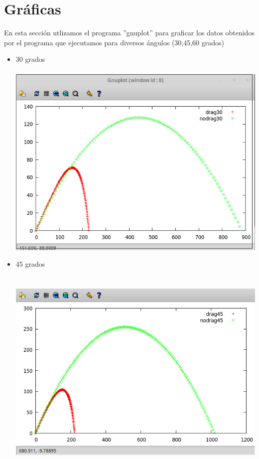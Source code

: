 \documentclass[10pt,a4paper]{article}
\begin{document}
\section*{Gr\'aficas}

En esta secci\'on utlizamos el programa ''gnuplot'' para graficar los datos obtenidos por el programa que ejecutamos para diversos \'angulos (30,45,60 grados)

\begin{itemize}
\item 30 grados
\\\\
\includegraphics[scale=0.5]{30grados}

\item 45 grados
\\\\\\
\includegraphics[scale=0.5]{45grados}


\end{itemize}
\end{document}
